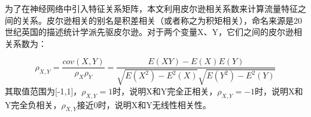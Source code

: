 为了在神经网络中引入特征关系矩阵，本文利用皮尔逊相关系数来计算流量特征之间的关系。皮尔逊相关的别名是积差相关（或者称之为积矩相关），命名来源是20 世纪英国的描述统计学派先驱皮尔逊。对于两个变量X、Y，它们之间的皮尔逊相关系数为：


\begin{equation}
  \rho_{X,Y} = \frac{cov(X,Y)}{\rho_X\rho_Y}=\frac{E(XY)-E(X)E(Y)}{\sqrt{E(X^2)-E^2(X)}\sqrt{E(Y^2)-E^2(Y)}}
\end{equation}
其取值范围为[-1,1]，$\rho_{X,Y}=1$时，说明X和Y完全正相关，$\rho_{X,Y}=-1$时，说明X和Y完全负相关，$\rho_{X,Y}$接近0时，说明X和Y无线性相关性。






